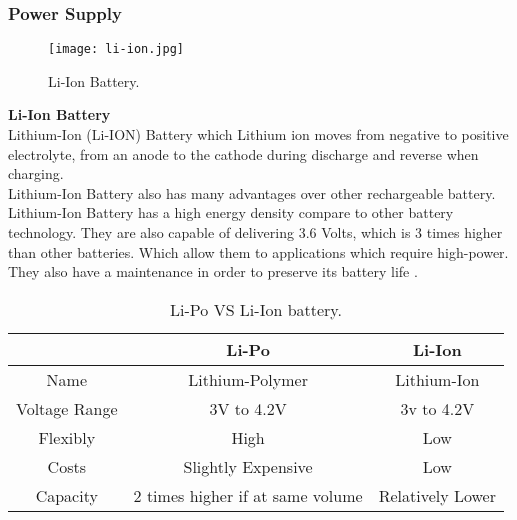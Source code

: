 \documentclass[12pt]{article}
\begin{document}
    \subsubsection{Power Supply}
    \begin{flushleft}
        \begin{flushleft}
            \begin{figure}[h!]
                \centering
                \texttt{[image: li-ion.jpg]}
                \caption{Li-Ion Battery.}
            \end{figure}
            \textbf{Li-Ion Battery}
            \\
            Lithium-Ion (Li-ION) Battery which Lithium ion moves from negative to positive electrolyte,
            from an anode to the cathode during discharge and reverse when charging. 
            \\
            \hspace*{2em}Lithium-Ion Battery also has many advantages over other rechargeable battery. Lithium-Ion Battery
            has a high energy density compare to other battery technology. They are also capable of delivering 3.6 Volts, which
            is 3 times higher than other batteries. Which allow them to applications which require high-power. They also have a maintenance
            in order to preserve its battery life
            \cite{batteries_comp}
            \cite{robu_batteries}.
        \end{flushleft}
        \begin{table}[!htbp]
        \centering
        \caption{Li-Po VS Li-Ion battery.}
            \begin{tabular}{c c c}
                \hline
                 & \textbf{Li-Po} & \textbf{Li-Ion} \\
                \hline
                Name          & Lithium-Polymer    & Lithium-Ion\\
                Voltage Range & 3V to 4.2V         & 3v to 4.2V\\
                Flexibly      & High               & Low\\
                Costs         & Slightly Expensive & Low\\
                Capacity      & 2 times higher if at same volume   & Relatively Lower\\
                \hline
            \end{tabular}
            \FloatBarrier
        \end{table}
    \end{flushleft}
    \FloatBarrier
\end{document}
